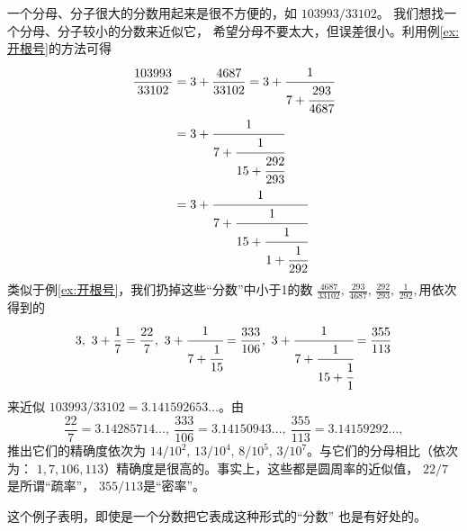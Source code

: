 \begin{example}\label{ex:化简分数}
	一个分母、分子很大的分数用起来是很不方便的，如 \( 103993/33102 \)。 我们想找一个分母、分子较小的分数来近似它，
	希望分母不要太大，但误差很小。利用例\ref{ex:开根号}的方法可得
	\begin{align*}
		\frac{103993}{33102} & = 3 + \frac{4687}{33102} = 3 + \cfrac{1}{7 + \cfrac{293}{4687}}     \\
		                     & = 3 + \cfrac{1}{7  + \cfrac{1}{15 + \cfrac{292}{293}}}              \\
		                     & = 3 + \cfrac{1}{7  + \cfrac{1}{15 + \cfrac{1}{1 + \cfrac{1}{292}}}}
	\end{align*}
	类似于例\ref{ex:开根号}，我们扔掉这些\enquote{分数}中小于1的数 \(\displaystyle \frac{4687}{33102},\,\frac{293}{4687},\,
	\frac{292}{293},\, \frac{1}{292}, \)用依次得到的
	\begin{equation*}
		3,\ 3 + \frac{1}{7} = \frac{22}{7},\ 3+ \cfrac{1}{7 + {\cfrac{1}{15}}} = \frac{333}{106},\ 3 + \cfrac{1}{7 +
			\cfrac{1}{15 + \cfrac{1}{1}}} = \frac{355}{113}
	\end{equation*}
	来近似 \( 103993/33102 = 3.141592653\dots \)。由
	\begin{equation*}
		\frac{22}{7} = 3.14285714\dots,\ \frac{333}{106} = 3.14150943\dots,\ \frac{355}{113} = 3.14159292\dots,
	\end{equation*}
	推出它们的精确度依次为 \(  14/10^2,\, 13/10^4,\, 8/10^5,\, 3/10^7 \)。与它们的分母相比（依次为： \( 1,7,106,113
	\)）精确度是很高的。事实上，这些都是圆周率\pi 的近似值， \( 22/7 \)是所谓\enquote{疏率}， \( 355/113 \)是\enquote{密率}。

	这个例子表明，即使是一个分数把它表成这种形式的\enquote{分数} 也是有好处的。
\end{example}

